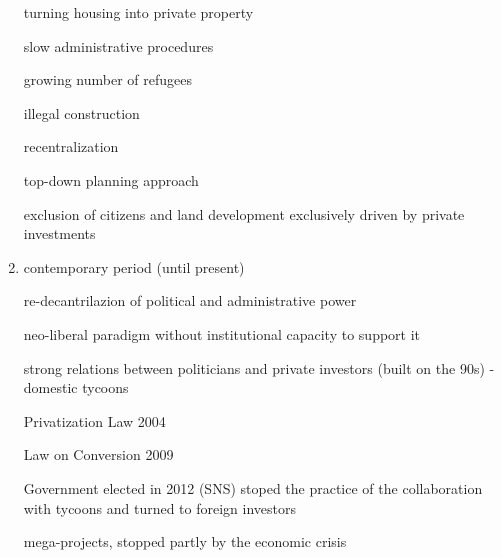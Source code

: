 \documentclass[11pt]{report}
\begin{document}
\begin{enumerate}
turning housing into private property

slow administrative procedures

growing number of refugees

illegal construction

recentralization

top-down planning approach

exclusion of citizens and land development exclusively driven by private investments

\item contemporary period (until present)

re-decantrilazion of political and administrative power

neo-liberal paradigm without institutional capacity to support it

strong relations between politicians and private investors (built on the 90s) - domestic tycoons

Privatization Law 2004

Law on Conversion 2009

Government elected in 2012 (SNS) stoped the practice of the collaboration with tycoons and turned to foreign investors

mega-projects, stopped partly by the economic crisis
\end{enumerate}
  
\end{document}
